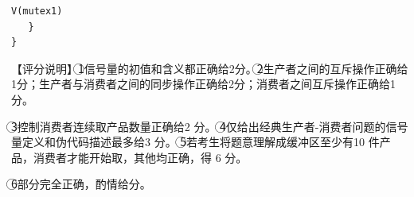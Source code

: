 \documentclass[UTF8,11pt]{ctexart}
\begin{document}
\begin{Verbatim}[breaklines,breakanywhere,fontsize=\small]
V(mutex1)
   }
}
\end{Verbatim}

【评分说明】\textcircled{1}信号量的初值和含义都正确给2分。\textcircled{2}生产者之间的互斥操作正确给1分；生产者与消费者之间的同步操作正确给2分；消费者之间互斥操作正确给1分。


\textcircled{3}控制消费者连续取产品数量正确给2 分。 \textcircled{4}仅给出经典生产者-消费者问题的信号量定义和伪代码描述最多给3 分。 \textcircled{5}若考生将题意理解成缓冲区至少有10 件产品，消费者才能开始取，其他均正确，得 6 分。


\textcircled{6}部分完全正确，酌情给分。
\end{document}
